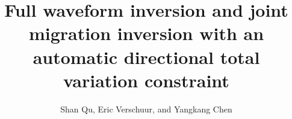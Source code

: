
\title{Full waveform inversion and joint migration inversion with an automatic directional total variation constraint}

\renewcommand{\thefootnote}{\fnsymbol{footnote}} 


\author{Shan Qu\footnotemark[1], Eric Verschuur\footnotemark[1], and Yangkang Chen\footnotemark[2]}
\address{
\footnotemark[1] Delft University of Technology, Delphi consortium, \\
Mekelweg 5, 2628 CD Delft, Netherlands \\
\footnotemark[2] School of Earth Sciences, \\
Zhejiang University\\
 Hangzhou, Zhejiang Province, 310027
}


\maketitle

